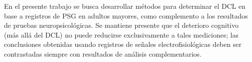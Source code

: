 


En el presente trabajo se busca desarrollar métodos para determinar el DCL en base a registros de PSG en adultos mayores, como complemento a los resultados de pruebas neuropsicológicas.
%
Se mantiene presente que el deterioro cognitivo (más allá del DCL) no puede reducirse exclusivamente a tales mediciones; las conclusiones obtenidas usando registros de señales electrofisiológicas deben ser contrastadas siempre con resultados de análisis complementarios.


